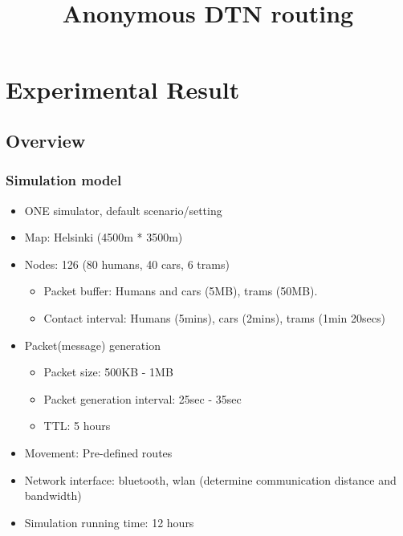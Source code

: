 \documentclass[11pt]{article}
\begin{document}
\title{Anonymous DTN routing}
\maketitle

\section{Experimental Result}
\subsection{Overview}

\subsubsection{Simulation model}
\begin{itemize}
 \item ONE simulator, default scenario/setting

 \item Map: Helsinki (4500m * 3500m)

 \item Nodes: 126 (80 humans, 40 cars, 6 trams)
  \begin{itemize}
   \item Packet buffer: Humans and cars (5MB), trams (50MB).
   \item Contact interval: Humans (5mins), cars (2mins), trams (1min 20secs)
  \end{itemize}

 \item Packet(message) generation
  \begin{itemize}
   \item Packet size: 500KB - 1MB
   \item Packet generation interval: 25sec - 35sec
   \item TTL: 5 hours
  \end{itemize}

 \item Movement: Pre-defined routes

 \item Network interface: bluetooth, wlan (determine communication distance and bandwidth)

 \item Simulation running time: 12 hours
\end{itemize}
\end{document}
